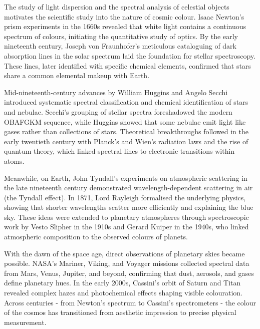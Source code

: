 \begin{historical}
The study of light dispersion and the spectral analysis of celestial objects motivates the scientific study into the nature of cosmic colour. Isaac Newton's prism experiments in the 1660s revealed that white light contains a continuous spectrum of colours, initiating the quantitative study of optics. By the early nineteenth century, Joseph von Fraunhofer's meticulous cataloguing of dark absorption lines in the solar spectrum laid the foundation for stellar spectroscopy. These lines, later identified with specific chemical elements, confirmed that stars share a common elemental makeup with Earth.

Mid-nineteenth-century advances by William Huggins and Angelo Secchi introduced systematic spectral classification and chemical identification of stars and nebulae. Secchi's grouping of stellar spectra foreshadowed the modern OBAFGKM sequence, while Huggins showed that some nebulae emit light like gases rather than collections of stars. Theoretical breakthroughs followed in the early twentieth century with Planck's and Wien's radiation laws and the rise of quantum theory, which linked spectral lines to electronic transitions within atoms.

Meanwhile, on Earth, John Tyndall's experiments on atmospheric scattering in the late nineteenth century demonstrated wavelength-dependent scattering in air (the Tyndall effect). In 1871, Lord Rayleigh formalised the underlying physics, showing that shorter wavelengths scatter more efficiently and explaining the blue sky. These ideas were extended to planetary atmospheres through spectroscopic work by Vesto Slipher in the 1910s and Gerard Kuiper in the 1940s, who linked atmospheric composition to the observed colours of planets.

With the dawn of the space age, direct observations of planetary skies became possible. NASA's Mariner, Viking, and Voyager missions collected spectral data from Mars, Venus, Jupiter, and beyond, confirming that dust, aerosols, and gases define planetary hues. In the early 2000s, Cassini's orbit of Saturn and Titan revealed complex hazes and photochemical effects shaping visible colouration. Across centuries - from Newton's spectrum to Cassini's spectrometers - the colour of the cosmos has transitioned from aesthetic impression to precise physical measurement.
\end{historical}
